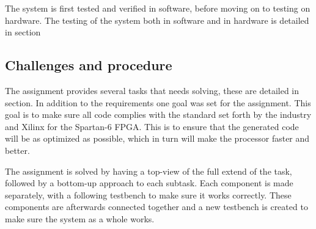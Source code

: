 The system is first tested and verified in software, before moving on to testing on hardware.
The testing of the system both in software and in hardware is detailed in section%

\subsection{Challenges and procedure}

The assignment provides several tasks that needs solving, these are detailed in section.%
In addition to the requirements one goal was set for the assignment.
This goal is to make sure all code complies with the standard set forth by the industry
and Xilinx for the Spartan-6 FPGA.
This is to ensure that the generated code will be as optimized as possible,
which in turn will make the processor faster and better.

The assignment is solved by having a top-view of the full extend of the task,
followed by a bottom-up approach to each subtask.
Each component is made separately, with a following testbench to make sure it works correctly.
These components are afterwards connected together and a new testbench is created to
make sure the system as a whole works.
